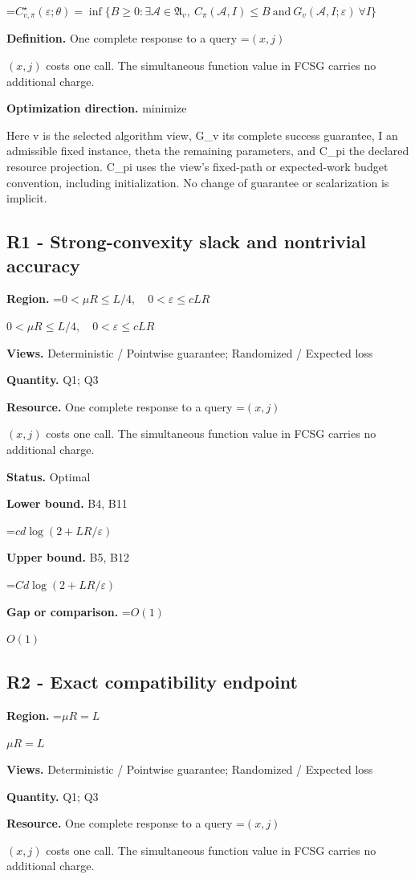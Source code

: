 \documentclass[10pt,a4paper]{article}
\newcommand{\AtlasMath}[1]{\par\begingroup\centering\setbox0=\hbox{$\displaystyle #1$}\ifdim\wd0>1.4\linewidth\typeout{ATLAS WIDE FORMULA: \the\wd0}\fi\ifdim\wd0>\linewidth\resizebox{\linewidth}{!}{\box0}\else\box0\fi\par\endgroup}
\newcommand{\AtlasInlineMath}[1]{\begingroup\setbox0=\hbox{$#1$}\ifdim\wd0>.4\linewidth\endgroup\AtlasMath{#1}\else\endgroup$#1$\fi}
\begin{document}
\AtlasMath{C^\star_{v,\pi}(\varepsilon;\theta)=\inf\{B\ge0:\exists\mathcal A\in\mathfrak A_v,\ C_\pi(\mathcal A,I)\le B\ \text{and}\ G_v(\mathcal A,I;\varepsilon)\ \forall I\}}
\textbf{Definition.} One complete response to a query \AtlasInlineMath{(x,j)} costs one call. The simultaneous function value in FCSG carries no additional charge.

\textbf{Optimization direction.} minimize

Here v is the selected algorithm view, G\_v its complete success guarantee, I an admissible fixed instance, theta the remaining parameters, and C\_pi the declared resource projection. C\_pi uses the view's fixed-path or expected-work budget convention, including initialization. No change of guarantee or scalarization is implicit.

\subsection{R1 - Strong-convexity slack and nontrivial accuracy}
\textbf{Region.} \AtlasInlineMath{0<\mu R\le L/4,\quad0<\varepsilon\le cLR}

\textbf{Views.} Deterministic / Pointwise guarantee; Randomized / Expected loss

\textbf{Quantity.} Q1; Q3

\textbf{Resource.} One complete response to a query \AtlasInlineMath{(x,j)} costs one call. The simultaneous function value in FCSG carries no additional charge.

\textbf{Status.} Optimal

\textbf{Lower bound.} B4, B11

\AtlasMath{cd\log(2+LR/\varepsilon)}
\textbf{Upper bound.} B5, B12

\AtlasMath{Cd\log(2+LR/\varepsilon)}
\textbf{Gap or comparison.} \AtlasInlineMath{O(1)}

\subsection{R2 - Exact compatibility endpoint}
\textbf{Region.} \AtlasInlineMath{\mu R=L}

\textbf{Views.} Deterministic / Pointwise guarantee; Randomized / Expected loss

\textbf{Quantity.} Q1; Q3

\textbf{Resource.} One complete response to a query \AtlasInlineMath{(x,j)} costs one call. The simultaneous function value in FCSG carries no additional charge.
\end{document}
